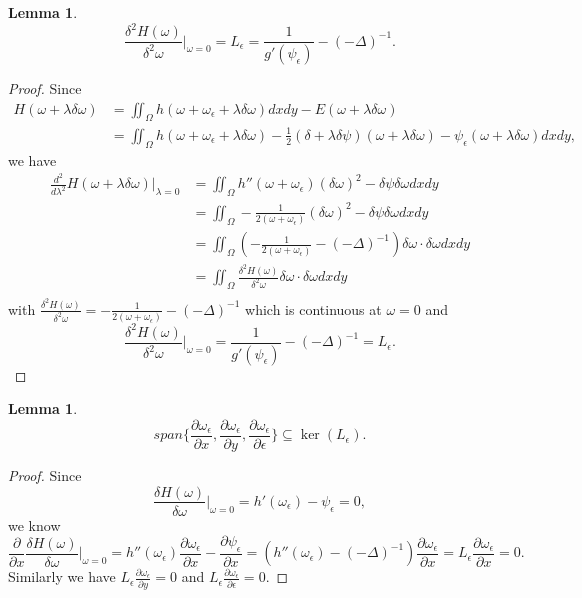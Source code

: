 \documentclass[1 [leqno, 11pt]{amsart}
\numberwithin{equation}{section}
\let\ep=\epsilon
\newtheorem{lemma}[Theorem]{Lemma}
\begin{document}
\begin{CJK*}{GBK}{song}
\begin{lemma}
$$\frac {\delta^2 H(\omega)}{\delta^2 \omega} |_{\omega = 0} = L_\epsilon = \frac 1 {g' (\psi_\epsilon ) } - (-\Delta)^{-1}.$$
\end{lemma}
\begin{proof}
Since
\begin{align*}
H(\omega+ \lambda \delta \omega )
&= \iint_{\Omega}  h(\omega + \omega_\ep + \lambda \delta \omega)dxdy  - E(\omega + \lambda \delta \omega) \\
& = \iint_{\Omega}  h(\omega + \omega_\ep + \lambda \delta \omega) -\frac 1 2 (\delta + \lambda \delta \psi) (\omega + \lambda \delta \omega) - \psi_\ep(\omega + \lambda \delta \omega) dxdy,
\end{align*}
we have
\begin{align*}
 \frac {d^2}{d\lambda ^2} H(\omega + \lambda \delta \omega )|_{\lambda = 0}
& = \iint_{\Omega} h'' (\omega + \omega_\ep) (\delta \omega)^2 - \delta \psi \delta \omega dxdy\\
& = \iint_{\Omega} -\frac {1} {2(\omega +\omega_\epsilon)} (\delta \omega)^2 - \delta \psi \delta \omega dxdy \\
& = \iint_{\Omega}( -\frac {1} {2(\omega +\omega_\epsilon)} - (-\Delta)^{-1}) \delta \omega \cdot \delta \omega dxdy \\
& = \iint_{\Omega} \frac {\delta^2 H(\omega)}{\delta^2 \omega} \delta \omega \cdot \delta \omega dxdy \\
\end{align*}
with $\frac {\delta^2 H(\omega)}{\delta^2 \omega} = -\frac {1} {2(\omega +\omega_\epsilon)} - (-\Delta)^{-1}$ which is continuous at $\omega = 0$ and
$$\frac {\delta^2 H(\omega)}{\delta^2 \omega} |_{\omega = 0} = \frac 1 {g' (\psi_\epsilon ) } - (-\Delta)^{-1} = L_\ep.$$
\end{proof}

 \begin{lemma}\label{JLw0}
 $$span \{\frac {\partial \omega_\epsilon }{\partial x} , \frac {\partial \omega_\epsilon }{\partial y} , \frac {\partial \omega_\epsilon }{\partial\epsilon} \} \subseteq \ker( L_\epsilon).$$
 \end{lemma}
\begin{proof}
Since $$\frac {\delta H(\omega)}{\delta \omega} |_{\omega = 0} = h'(\omega_\ep) - \psi_\ep= 0,$$ we know
\begin{equation}\label{Lw}
\frac {\partial}{\partial x}\frac {\delta H(\omega)}{\delta \omega} |_{\omega = 0} = h''(\omega_\ep)\frac {\partial \omega_\epsilon }{\partial x} -  \frac {\partial \psi_\epsilon }{\partial x}=  ( h''(\omega_\ep) - (-\Delta)^{-1} )\frac {\partial \omega_\epsilon }{\partial x}= L_\epsilon \frac {\partial \omega_\epsilon }{\partial x} = 0.
\end{equation}
Similarly we have $L_\epsilon \frac {\partial \omega_\epsilon }{\partial y} = 0$ and $L_\epsilon \frac {\partial\omega_\epsilon }{\partial\epsilon} = 0$.
\end{proof}


\end{CJK*}
\end{document}
